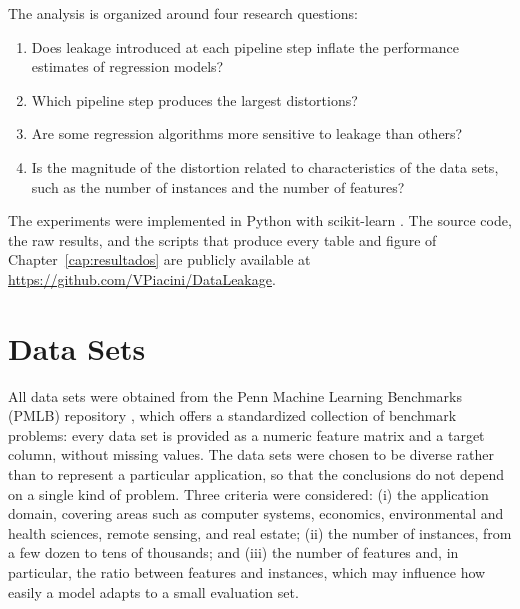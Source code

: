 The analysis is organized around four research questions:

\begin{enumerate}
  \item[\textbf{RQ1}] Does leakage introduced at each pipeline step inflate the
  performance estimates of regression models?
  \item[\textbf{RQ2}] Which pipeline step produces the largest distortions?
  \item[\textbf{RQ3}] Are some regression algorithms more sensitive to leakage
  than others?
  \item[\textbf{RQ4}] Is the magnitude of the distortion related to
  characteristics of the data sets, such as the number of instances and the
  number of features?
\end{enumerate}

The experiments were implemented in Python with scikit-learn
\cite{pedregosa2011}. The source code, the raw results, and the scripts that
produce every table and figure of Chapter~\ref{cap:resultados} are publicly
available at \url{https://github.com/VPiacini/DataLeakage}.

\section{Data Sets}
\label{sec:met-dados}

All data sets were obtained from the Penn Machine Learning Benchmarks (PMLB)
repository \cite{olson2017,romano2022}, which offers a standardized collection of benchmark problems: every data set is
provided as a numeric feature matrix and a target column, without missing values.
The data sets were chosen to be diverse rather than to represent a particular
application, so that the conclusions do not depend on a single kind of problem. Three criteria
were considered: (i) the application domain, covering areas such as computer
systems, economics, environmental and health sciences, remote sensing, and real
estate; (ii) the number of instances, from a few dozen to tens of thousands; and
(iii) the number of features and, in particular, the ratio between features and
instances, which may influence how easily a model adapts to a small
evaluation set.


